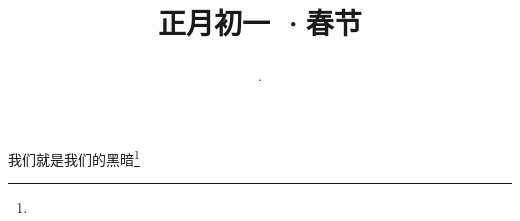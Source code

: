 \title{\date[d=10,m=2,y=2024][year:cn-y,年,month:cn,day:cn,日,·,weekday]·正月初一 ·春节}
我们就是我们的黑暗\footnote{ }

